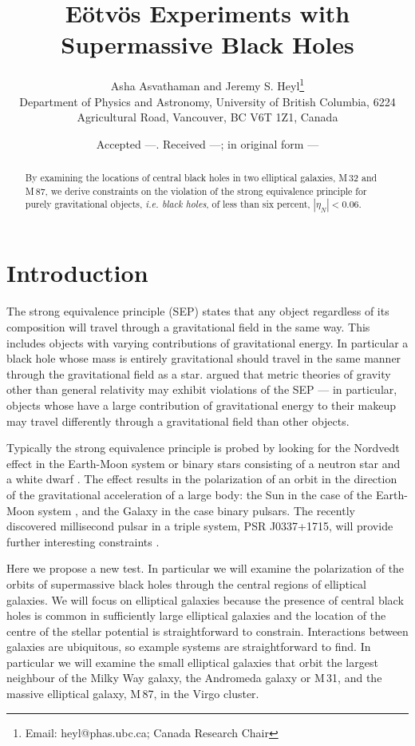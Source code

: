 \documentclass[useAMS,usenatbib]{mn2e}
\title[E\"otv\"os Experiments]{E\"otv\"os Experiments with 
  Supermassive Black Holes  }
\author[A. Asvathaman and J. S. Heyl]{Asha Asvathaman and Jeremy S. Heyl\thanks{Email:
    heyl@phas.ubc.ca; Canada Research Chair} \\
Department of Physics and Astronomy, University of British
Columbia, 6224 Agricultural Road, Vancouver, BC V6T 1Z1, Canada}
\begin{document}
\date{Accepted ---. Received ---; in original form ---}

\pagerange{\pageref{firstpage}--\pageref{lastpage}} 

\maketitle

\label{firstpage}

\begin{abstract}
  By examining the locations of central black holes in two elliptical
  galaxies, M\,32 and M\,87, we derive constraints on the violation of
  the strong equivalence principle for purely gravitational objects,
  {\em i.e. black holes}, of less than six percent, $|\eta_N|<0.06$.
\end{abstract}

\section{Introduction}

The strong equivalence principle (SEP) states that any object
regardless of its composition will travel through a gravitational
field in the same way.  This includes objects with varying
contributions of gravitational energy.  In particular a black hole
whose mass is entirely gravitational should travel in the same manner
through the gravitational field as a
star. \citet{1968PhRv..169.1014N,1968PhRv..169.1017N} argued that
metric theories of gravity other than general relativity may exhibit
violations of the SEP --- in particular,
objects whose have a large contribution of gravitational energy to
their makeup may travel differently through a gravitational field than
other objects.

Typically the strong equivalence principle is probed by looking for
the Nordvedt effect in the Earth-Moon system or binary stars
consisting of a neutron star and a white dwarf \citep{Stairs:2005}.
The \citet{1968PhRv..170.1186N} effect results in the polarization of
an orbit in the direction of the gravitational acceleration of a large
body: the Sun in the case of the Earth-Moon system
\citep{1976PhRvL..36..551W,1976PhRvL..36..555S}, and the Galaxy in the
case binary pulsars.  The recently discovered millisecond pulsar in a
triple system, PSR J0337+1715, will provide further interesting
constraints \citep{Ransom:2014aa}.

Here we propose a new test.  In particular we will examine the
polarization of the orbits of supermassive black holes through the
central regions of elliptical galaxies.  We will focus on elliptical
galaxies because the presence of central black holes is common in
sufficiently large elliptical galaxies and the location of the centre
of the stellar potential is straightforward to constrain.
Interactions between galaxies are ubiquitous, so example systems are
straightforward to find.  In particular we will examine the small
elliptical galaxies that orbit the largest neighbour of the Milky Way
galaxy, the Andromeda galaxy or M\,31, and the massive elliptical
galaxy, M\,87, in the Virgo cluster.
\end{document}
